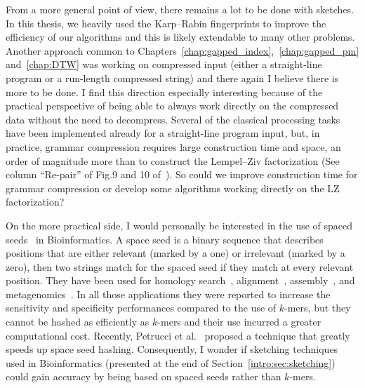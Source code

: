 From a more general point of view, there remains a lot to be done with sketches. In this thesis, we heavily used the Karp--Rabin fingerprints to improve the efficiency of our algorithms and this is likely extendable to many other problems. Another approach common to Chapters~\ref*{chap:gapped_index},~\ref*{chap:gapped_pm} and~\ref*{chap:DTW} was working on compressed input (either a straight-line program or a run-length compressed string) and there again I believe there is more to be done. I find this direction especially interesting because of the practical perspective of being able to always work directly on the compressed data without the need to decompress. Several of the classical processing tasks have been implemented already for a straight-line program input, but, in practice, grammar compression requires large construction time and space, an order of magnitude more than to construct the Lempel--Ziv factorization (See column ``Re-pair'' of Fig.9 and 10 of~\cite{DBLP:journals/jcss/ClaudeNP21}). So could we improve construction time for grammar compression or develop some algorithms working directly on the LZ factorization?


On the more practical side, I would personally be interested in the use of spaced seeds~\cite{li2004patternhunter} in Bioinformatics. A space seed is a binary sequence that describes positions that are either relevant (marked by a one) or irrelevant (marked by a zero), then two strings match for the spaced seed if they match at every relevant position.
They have been used for homology search~\cite{ma2002patternhunter}, alignment~\cite{david2011shrimp2}, assembly~\cite{birol2015spaced}, and metagenomics~\cite{bvrinda2015spaced}. In all those applications they were reported to increase the sensitivity and specificity performances compared to the use of $k$-mers, but they cannot be hashed as efficiently as $k$-mers and their use incurred a greater computational cost. Recently, Petrucci et al.~\cite{petrucci2020iterative} proposed a technique that greatly speeds up space seed hashing. Consequently, I wonder if sketching techniques used in Bioinformatics (presented at the end of Section~\ref{intro:sec:sketching}) could gain accuracy by being based on spaced seeds rather than $k$-mers.

\backmatter